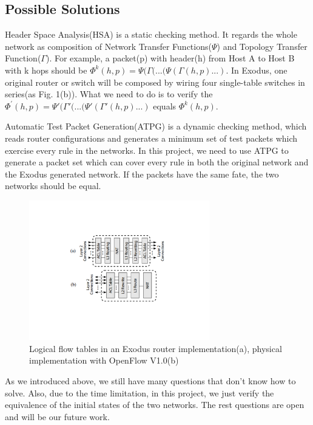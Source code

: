 \documentclass[11pt]{article}
\begin{document}
\subsection{Possible Solutions}
\par Header Space Analysis(HSA) is a static checking method. It regards the whole network as composition of Network Transfer Functions($\Psi$) and Topology Transfer Function($\Gamma$). For example, a packet(p) with header(h) from Host A to Host B with k hops should be $\Phi^{k}(h,p)=\Psi(\Gamma(...(\Psi(\Gamma(h,p)...)$. In Exodus, one original router or switch will be composed by wiring four single-table switches in series(as Fig. 1(b)). What we need to do is to verify the $\Phi^{'}(h,p)=\Psi'(\Gamma'(...(\Psi'(\Gamma'(h,p)...)$ equals $\Phi^{k}(h,p)$.
\par Automatic Test Packet Generation(ATPG) is a dynamic checking method, which reads router configurations and generates a minimum set of test packets which exercise every rule in the networks. In this project, we need to use ATPG to generate a packet set which can cover every rule in both the original network and the Exodus generated network. If the packets have the same fate, the two networks should be equal.
\begin{figure}
\centering
\includegraphics[width=0.7\textwidth]{ExodusRouter}
\vspace{-1.1in}
\caption{Logical flow tables in an Exodus router implementation(a), physical implementation with OpenFlow V1.0(b)}
\end{figure}
\par As we introduced above, we still have many questions that don't know how to solve. Also, due to the time limitation, in this project, we just verify the equivalence of the initial states of the two networks. The rest questions are open and will be our future work.
\end{document}
